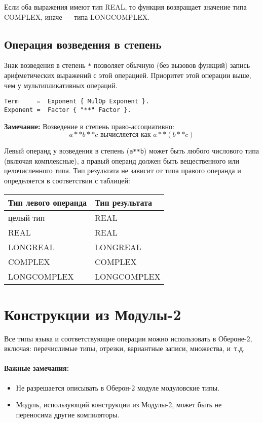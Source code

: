 Если оба выражения имеют тип REAL,
то функция возвращает значение типа COMPLEX,
иначе --- типа LONGCOMPLEX.

\subsection{Операция возведения в степень}

\onumextonly{}

Знак возведения в степень {\tt **} позволяет обычную 
(без вызовов функций)
запись арифметических выражений с этой операцией.
Приоритет этой операции выше, чем у мультипликативных операций.
\begin{verbatim}
Term     =  Exponent { MulOp Exponent }.
Exponent =  Factor { "**" Factor }.
\end{verbatim}
{\bf Замечание:} Возведение в степень право-ассоциативно:
$$
  a**b**c \mbox{ вычисляется как } a**(b**c)
$$

Левый операнд у возведения в степень ({\tt a**b}) 
может быть любого числового типа (включая комплексные), а правый
операнд должен быть вещественного или целочисленного типа. Тип 
результата не зависит от типа правого операнда и определяется в 
соответствии с таблицей:
\begin{center}
\begin{tabular}{|l|l|} \hline
\bf Тип левого операнда & \bf Тип результата \\ \hline
целый тип       & REAL \\
REAL            & REAL \\
LONGREAL        & LONGREAL \\
COMPLEX         & COMPLEX \\
LONGCOMPLEX     & LONGCOMPLEX \\
\hline
\end{tabular}
\end{center}

\section{Конструкции из Модулы-2}\label{o2:usingm2}

Все типы языка \mt{} и соответствующие операции можно использовать
в Обероне-2, включая: перечислимые типы, отрезки, вариантные записи,
множества, и~т.д.

\paragraph{Важные замечания:}
\begin{itemize}
\item Не разрешается описывать в Оберон-2 модуле модуловские типы.
\item Модуль, использующий конструкции из Модулы-2, может быть 
не переносима другие компиляторы.
\end{itemize}

